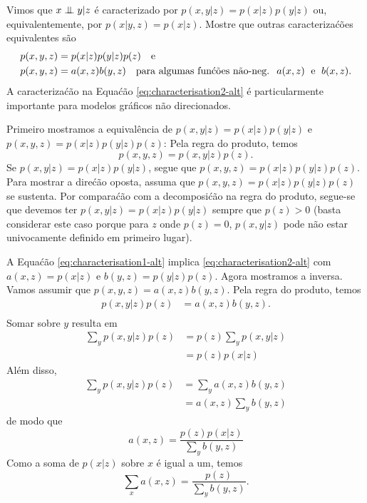 \label{ex:independencies1}
Vimos que $x \mathrel{\perp\mspace{-10mu}\perp} y | z$ \'e caracterizado por
$p(x,y | z) =p(x | z) p(y| z)$
ou, equivalentemente, por
$p(x| y, z) = p(x | z)$.
Mostre que outras caracteriza\'c\~oes equivalentes s\~ao
\begin{align}
    p(x,y,z) &= p(x|z) p(y|z) p(z) \quad \text{e} \label{eq:characterisation1-alt} \\
    p(x,y,z) &= a(x,z) b(y,z) \quad \text{para algumas fun\'c\~oes n\~ao-neg. \;} a(x,z) \text{\; e \;} b(x,z). \label{eq:characterisation2-alt} 
\end{align}
A caracteriza\'c\~ao na Equa\'c\~ao \eqref{eq:characterisation2-alt} \'e particularmente importante para modelos gr\'aficos n\~ao direcionados.
\begin{solution}
    Primeiro mostramos a equival\^encia de $p(x,y | z) =p(x | z) p(y| z)$ e
    $p(x,y,z) = p(x|z) p(y|z) p(z)$: Pela regra do produto, temos
    $$p(x,y,z) = p(x,y|z) p(z).$$ Se $p(x,y | z) =p(x | z) p(y| z)$,
    segue que $p(x,y,z) = p(x|z) p(y|z) p(z)$. Para mostrar a dire\'c\~ao oposta, assuma que $p(x,y,z) = p(x|z) p(y|z) p(z)$ se sustenta. Por
    compara\'c\~ao com a decomposi\'c\~ao na regra do produto, segue-se
    que devemos ter $p(x,y | z) = p(x | z) p(y| z)$ sempre que $p(z)>0$
    (basta considerar este caso porque para $z$ onde $p(z)=0$, $p(x,y | z)$ pode n\~ao estar
    univocamente definido em primeiro lugar).
    
    A Equa\'c\~ao \eqref{eq:characterisation1-alt} implica
    \eqref{eq:characterisation2-alt} com $a(x,z) = p(x | z)$ e $b(y,z) =
    p(y| z)p(z)$. Agora mostramos a inversa. Vamos assumir que $p(x,y,z)
    = a(x,z) b(y,z)$. Pela regra do produto, temos
    \begin{align}
        p(x,y | z)p(z) & = a(x,z) b(y,z).\\
    \end{align}
    Somar sobre $y$ resulta em
    \begin{align}
        \sum_y  p(x,y | z)p(z) & = p(z) \sum_y p(x,y | z)\\
        & = p(z) p(x|z)
    \end{align}
    Al\'em disso,
    \begin{align}
        \sum_y  p(x,y | z)p(z) & = \sum_y  a(x,z) b(y,z)\\
        & = a(x,z) \sum_y b(y,z)
    \end{align}
    de modo que 
    \begin{equation}
        a(x,z) = \frac{p(z) p(x | z)}{\sum_y b(y,z)}
        \label{eq:a-alt}
    \end{equation}
    Como a soma de $p(x | z)$ sobre $x$ \'e igual a um, temos
    \begin{equation}
        \sum_x a(x,z) = \frac{p(z)}{\sum_y b(y,z)}.
        \label{eq:asum-alt}
    \end{equation}
    

\end{solution}
